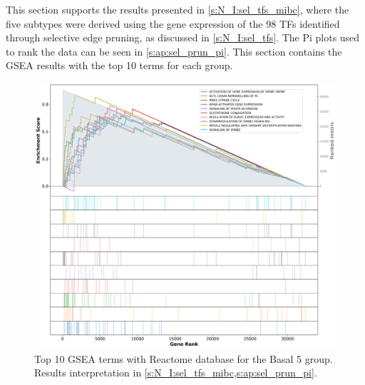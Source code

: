 This section supports the results presented in \cref{s:N_I:sel_tfs_mibc}, where the five subtypes were derived using the gene expression of the 98 TFs identified through selective edge pruning, as discussed in \cref{s:N_I:sel_tfs}. The Pi plots used to rank the data can be seen in \cref{s:ap:sel_prun_pi}. This section contains the GSEA results with the top 10 terms for each group.


\begin{figure}[!htb]
    \centering
    \includegraphics[width=\textwidth,keepaspectratio]{Sections/Network_I/Resources/selective_pruning/gsea/smallBasal_10_top_manTerms.png}
    \caption{Top 10 GSEA terms with Reactome database for the Basal 5 group. Results interpretation in \cref{s:N_I:sel_tfs_mibc,s:ap:sel_prun_pi}.}
    \label{fig:ap:gsea_smallBasal}
\end{figure}


